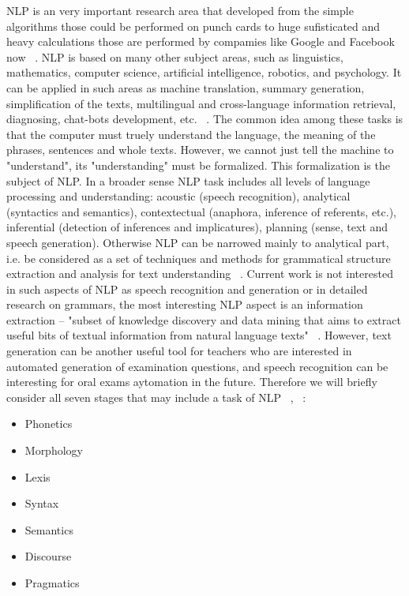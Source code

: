 NLP is an very important research area that developed from the simple algorithms those could be performed on punch cards to huge sufisticated and heavy calculations those are performed by compamies like Google and Facebook now ~\cite{Cambria}. NLP is based on many other subject areas, such as linguistics, mathematics, computer science, artificial intelligence, robotics, and psychology. It can be applied in such areas as machine translation, summary generation, simplification of the texts, multilingual and cross-language information retrieval, diagnosing, chat-bots development, etc. ~\cite{Chowdhury}. The common idea among these tasks is that the computer must truely understand the language, the meaning of the phrases, sentences and whole texts. However, we cannot just tell the machine to "understand", its "understanding" must be formalized. This formalization is the subject of NLP. In a broader sense NLP task includes all levels of language processing and understanding: acoustic (speech recognition), analytical (syntactics and semantics), contextectual (anaphora, inference of referents, etc.), inferential (detection of inferences and implicatures), planning (sense, text and speech generation). Otherwise NLP can be narrowed mainly to analytical part, i.e. be considered as a set of techniques and methods for grammatical structure extraction and analysis for text understanding  ~\cite{Steedman}. Current work is not interested in such aspects of NLP as speech recognition and generation or in detailed research on grammars, the most interesting NLP aspect is an information extraction -- "subset of knowledge discovery and data mining that aims to extract useful bits of textual information from natural language texts" ~\cite{Chowdhury}.
However, text generation can be another useful tool for teachers who are interested in automated generation of examination questions, and speech recognition can be interesting for oral exams aytomation in the future. Therefore we will briefly consider all seven stages that may include a task of NLP ~\cite{Chowdhury}, ~\cite{Saad}:
\begin{itemize}
\item Phonetics
\item Morphology
\item Lexis 
\item Syntax
\item Semantics
\item Discourse
\item Pragmatics
\end{itemize}
 
